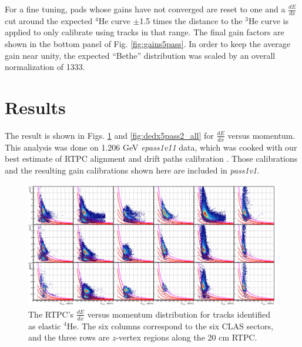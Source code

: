 \documentclass[amsmath,amssymb,notitlepage,12pt]{revtex4-1}
\begin{document}

For a fine tuning, pads whose gains have not converged are reset to one and a $\frac{dE}{dx}$ cut around the expected $^4$He curve $\pm$1.5 times the distance to the $^3$He curve is applied to only calibrate using tracks in that range.  The final gain factors are shown in the bottom panel of Fig. \ref{fig:gains5pass}.  In order to keep the average gain near unity, the expected ``Bethe'' distribution was scaled by an overall normalization of 1333.

\section{Results}
The result is shown in Figs. \ref{fig:dedx5pass2} and \ref{fig:dedx5pass2_all} for $\frac{dE}{dx}$ versus momentum.
This analysis was done on 1.206 GeV {\it epass1v11} data, which was cooked with our best estimate of RTPC alignment and drift paths calibration \cite{rtpcalign,driftpaths}.  Those calibrations and the resulting gain calibrations shown here are included in {\it pass1v1}.


\begin{figure}[htbp]\centering
    \includegraphics[width=17cm]{iter005__sectorsZCBPchopgainsrestartdedxcut.png}
    \caption{The RTPC's $\frac{dE}{dx}$ versus momentum distribution for tracks identified as elastic $^4$He.  The six columns correspond to the six CLAS sectors, and the three rows are $z$-vertex regions along the 20 cm RTPC.\label{fig:dedx5pass2}}
\end{figure}
\end{document}

